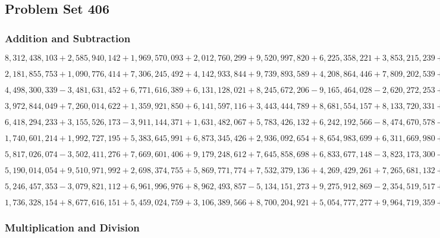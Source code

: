 \hypertarget{problem-set-406}{%
\subsection{Problem Set 406}\label{problem-set-406}}

\hypertarget{addition-and-subtraction}{%
\subsubsection{Addition and
Subtraction}\label{addition-and-subtraction}}

\(8,312,438,103+2,585,940,142+1,969,570,093+2,012,760,299+9,520,997,820+6,225,358,221+3,853,215,239+1,923,863,710+5,460,407,965+9,806,974,143\)

\(2,181,855,753+1,090,776,414+7,306,245,492+4,142,933,844+9,739,893,589+4,208,864,446+7,809,202,539+5,902,468,735+6,276,242,983+9,798,972,866\)

\(4,498,300,339-3,481,631,452+6,771,616,389+6,131,128,021+8,245,672,206-9,165,464,028-2,620,272,253+5,162,444,446+2,198,895,070-8,330,426,858\)

\(3,972,844,049+7,260,014,622+1,359,921,850+6,141,597,116+3,443,444,789+8,681,554,157+8,133,720,331+9,109,272,639+9,555,690,630+5,098,005,166\)

\(6,418,294,233+3,155,526,173-3,911,144,371+1,631,482,067+5,783,426,132+6,242,192,566-8,474,670,578-5,214,963,889+6,653,454,017-8,405,586,655\)

\(1,740,601,214+1,992,727,195+5,383,645,991+6,873,345,426+2,936,092,654+8,654,983,699+6,311,669,980+8,810,053,733+8,973,992,754+8,063,321,737\)

\(5,817,026,074-3,502,411,276+7,669,601,406+9,179,248,612+7,645,858,698+6,833,677,148-3,823,173,300-5,909,038,997+1,147,268,215-7,984,831,804\)

\(5,190,014,054+9,510,971,992+2,698,374,755+5,869,771,774+7,532,379,136+4,269,429,261+7,265,681,132+3,790,750,567+3,744,480,118+2,860,923,559\)

\(5,246,457,353-3,079,821,112+6,961,996,976+8,962,493,857-5,134,151,273+9,275,912,869-2,354,519,517+4,161,969,275-2,181,152,411+3,486,793,863\)

\(1,736,328,154+8,677,616,151+5,459,024,759+3,106,389,566+8,700,204,921+5,054,777,277+9,964,719,359+1,397,286,930+1,548,517,401+1,154,117,202\)

\hypertarget{multiplication-and-division}{%
\subsubsection{Multiplication and
Division}\label{multiplication-and-division}}


